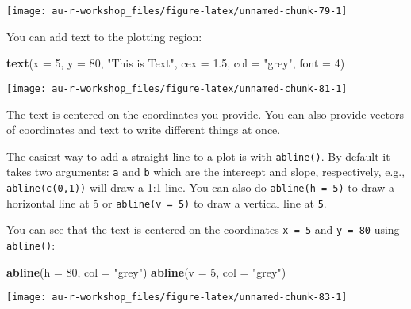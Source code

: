 \documentclass[]{book}
\newenvironment{Shaded}{\begin{snugshade}}{\end{snugshade}}
\newcommand{\KeywordTok}[1]{\textcolor[rgb]{0.13,0.29,0.53}{\textbf{#1}}}
\newcommand{\DataTypeTok}[1]{\textcolor[rgb]{0.13,0.29,0.53}{#1}}
\newcommand{\DecValTok}[1]{\textcolor[rgb]{0.00,0.00,0.81}{#1}}
\newcommand{\FloatTok}[1]{\textcolor[rgb]{0.00,0.00,0.81}{#1}}
\newcommand{\StringTok}[1]{\textcolor[rgb]{0.31,0.60,0.02}{#1}}
\newcommand{\NormalTok}[1]{#1}
\theoremstyle{definition}
\theoremstyle{definition}
\theoremstyle{definition}
\theoremstyle{remark}
\begin{document}
\begin{center}\texttt{[image: au-r-workshop\_files/figure-latex/unnamed-chunk-79-1]} \end{center}

You can add text to the plotting region:

\begin{Shaded}
\begin{Highlighting}[]
\KeywordTok{text}\NormalTok{(}\DataTypeTok{x =} \DecValTok{5}\NormalTok{, }\DataTypeTok{y =} \DecValTok{80}\NormalTok{, }\StringTok{"This is Text"}\NormalTok{, }\DataTypeTok{cex =} \FloatTok{1.5}\NormalTok{, }\DataTypeTok{col =} \StringTok{"grey"}\NormalTok{, }\DataTypeTok{font =} \DecValTok{4}\NormalTok{)}
\end{Highlighting}
\end{Shaded}

\begin{center}\texttt{[image: au-r-workshop\_files/figure-latex/unnamed-chunk-81-1]} \end{center}

The text is centered on the coordinates you provide. You can also
provide vectors of coordinates and text to write different things at
once.

The easiest way to add a straight line to a plot is with
\texttt{abline()}. By default it takes two arguments: \texttt{a} and
\texttt{b} which are the intercept and slope, respectively, e.g.,
\texttt{abline(c(0,1))} will draw a 1:1 line. You can also do
\texttt{abline(h\ =\ 5)} to draw a horizontal line at 5 or
\texttt{abline(v\ =\ 5)} to draw a vertical line at \texttt{5}.

You can see that the text is centered on the coordinates
\texttt{x\ =\ 5} and \texttt{y\ =\ 80} using \texttt{abline()}:

\begin{Shaded}
\begin{Highlighting}[]
\KeywordTok{abline}\NormalTok{(}\DataTypeTok{h =} \DecValTok{80}\NormalTok{, }\DataTypeTok{col =} \StringTok{"grey"}\NormalTok{)}
\KeywordTok{abline}\NormalTok{(}\DataTypeTok{v =} \DecValTok{5}\NormalTok{, }\DataTypeTok{col =} \StringTok{"grey"}\NormalTok{)}
\end{Highlighting}
\end{Shaded}

\begin{center}\texttt{[image: au-r-workshop\_files/figure-latex/unnamed-chunk-83-1]} \end{center}
\end{document}
